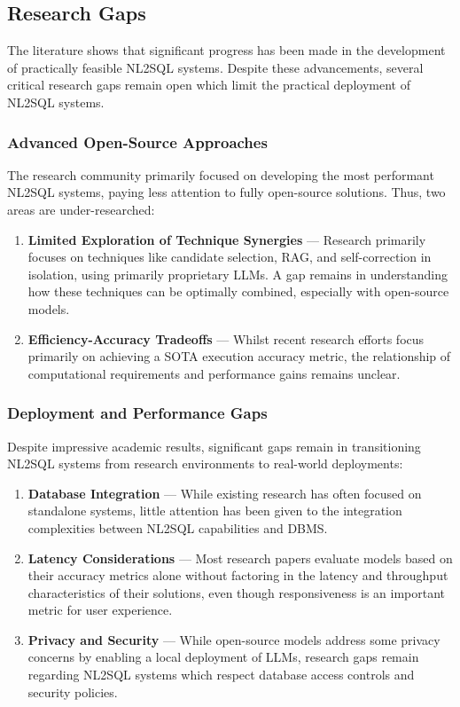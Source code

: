 \subsection{Research Gaps}

The literature shows that significant progress has been made in the development of
practically feasible NL2SQL systems. Despite these advancements, several critical
research gaps remain open which limit the practical deployment of NL2SQL
systems.

\subsubsection{Advanced Open-Source Approaches}

The research community primarily focused on developing the most performant
NL2SQL systems, paying less attention to fully open-source solutions. Thus,
two areas are under-researched:

\begin{enumerate}
    \item \textbf{Limited Exploration of Technique Synergies} — Research
        primarily focuses on techniques like candidate selection, RAG, and
        self-correction in isolation, using primarily proprietary LLMs.
        A gap remains in understanding how these techniques can be optimally
        combined, especially with open-source models.
    \item \textbf{Efficiency-Accuracy Tradeoffs} — Whilst recent research
        efforts focus primarily on achieving a SOTA execution accuracy metric,
        the relationship of computational requirements and performance gains
        remains unclear.
\end{enumerate}

\subsubsection{Deployment and Performance Gaps}

Despite impressive academic results, significant gaps remain in transitioning
NL2SQL systems from research environments to real-world deployments:

\begin{enumerate}
    \item \textbf{Database Integration} — While existing research has often
        focused on standalone systems, little attention has been given to the
        integration complexities between NL2SQL capabilities and DBMS.
    \item \textbf{Latency Considerations} — Most research papers
        evaluate models based on their accuracy metrics alone without factoring
        in the latency and throughput characteristics of their solutions,
        even though responsiveness is an important metric for user experience.
    \item \textbf{Privacy and Security} — While open-source models address some
        privacy concerns by enabling a local deployment of LLMs, research gaps
        remain regarding NL2SQL systems which respect database access controls
        and security policies.
\end{enumerate}

